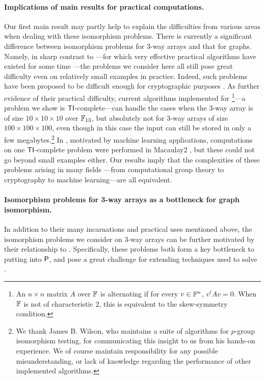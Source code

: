 \paragraph{Implications of main results for practical 
computations.} Our first 
main result may partly help to explain the difficulties from various areas when dealing 
with these isomorphism problems. There is currently a significant difference between isomorphism 
problems for 3-way arrays and that for graphs. Namely, in sharp contrast to 
\GIlong---for 
which very effective practical algorithms have existed for some
time \cite{McK80,MP14}---the 
problems we consider here all still pose great difficulty even on relatively small 
examples in practice. Indeed, such problems have been proposed to be difficult 
enough 
for cryptographic purposes \cite{Pat96,JQSY19}. As further evidence of their 
practical 
difficulty, current 
algorithms implemented for \AltMatSpIsomlong\footnote{An $n\times n$ matrix $A$ 
over $\mathbb{F}$ is alternating if for every $v\in \mathbb{F}^n$, $v^tAv=0$. When $\mathbb{F}$ is not of 
characteristic $2$, this is equivalent to the skew-symmetry condition.}---a 
problem we show is $\mathsf{TI}$-complete---can handle the 
cases when the 3-way array is of size $10\times 10\times 10$ over $\mathbb{F}_{13}$, but 
absolutely  not for 3-way arrays of size $100\times 100\times 100$, even though in 
this case the input can still be stored  in only a 
few megabytes.\footnote{We thank James B. Wilson, who maintains a suite of 
algorithms for $p$-group isomorphism testing, for communicating this insight to us 
from his hands-on 
experience. We of course maintain responsibility for any possible 
misunderstanding, or lack of knowledge regarding the performance of other 
implemented algorithms.}
In \cite{PSS18}, motivated by machine learning applications, 
computations on one $\mathsf{TI}$-complete problem were performed in Macaulay2 \cite{M2}, but these could 
not go beyond small examples either. 
Our results imply that the complexities of these problems arising in many fields%
---from computational group theory to cryptography to machine learning---are all 
equivalent.

\paragraph{Isomorphism problems for 3-way arrays as a bottleneck for graph 
isomorphism.}
In addition to their many 
incarnations and practical uses mentioned above, the isomorphism problems we 
consider on 3-way arrays can be further motivated by their relationship to \GI. 
Specifically, these problems both form a key bottleneck to putting \GI into 
$\mathsf{P}$, and pose a great challenge for extending techniques used to solve \GI.

